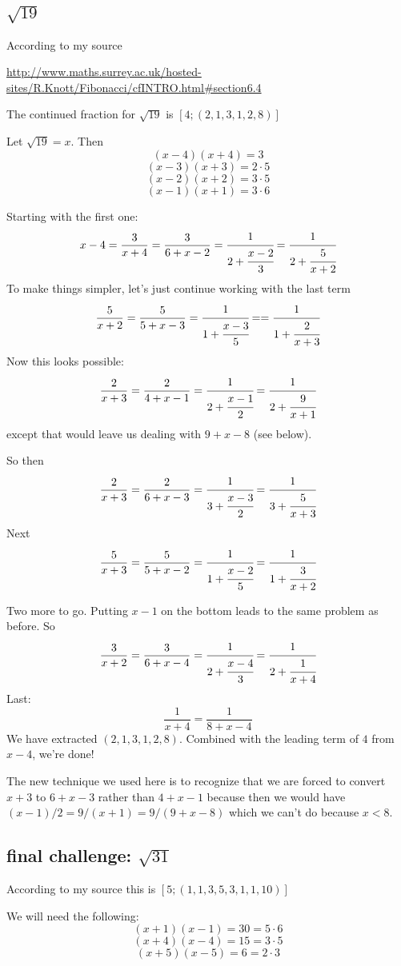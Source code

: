 \documentclass[11pt, oneside]{article}
\begin{document}
\subsection*{$\sqrt{19}$}
According to my source

\url{http://www.maths.surrey.ac.uk/hosted-sites/R.Knott/Fibonacci/cfINTRO.html#section6.4}

The continued fraction for $\sqrt{19}$ is $[4;(2,1,3,1,2,8)]$  

Let $\sqrt{19} = x$.  Then
\[ (x - 4)(x + 4) = 3 \]
\[ (x - 3)(x + 3) = 2 \cdot 5 \]
\[ (x - 2)(x + 2) = 3 \cdot 5 \]
\[ (x - 1)(x + 1) = 3 \cdot 6 \]

Starting with the first one:
\[ x - 4 = \frac{3}{x + 4} = \frac{3}{6 + x - 2} = \cfrac{1}{2 + \cfrac{x-2}{3}} = \cfrac{1}{2 + \cfrac{5}{x + 2}}  \]
To make things simpler, let's just continue working with the last term
\[ \frac{5}{x + 2} = \frac{5}{5 + x - 3} = \cfrac{1}{1 + \cfrac{x - 3}{5}} = = \cfrac{1}{1 + \cfrac{2}{x + 3}} \]
Now this looks possible:
\[ \frac{2}{x + 3} =  \frac{2}{4 + x - 1} =  \cfrac{1}{2 + \cfrac{x - 1}{2}} =  \cfrac{1}{2 + \cfrac{9}{x + 1}}  \]
except that would leave us dealing with $9 + x - 8$ (see below).

So then
\[ \frac{2}{x + 3} =  \frac{2}{6 + x - 3} =  \cfrac{1}{3 + \cfrac{x - 3}{2}} =  \cfrac{1}{3 + \cfrac{5}{x + 3}}  \]
Next
\[ \frac{5}{x + 3} = \frac{5}{5 + x - 2} =  \cfrac{1}{1 + \cfrac{x - 2}{5}} =  \cfrac{1}{1 + \cfrac{3}{x + 2}}  \]

Two more to go.  Putting $x - 1$ on the bottom leads to the same problem as before.  So
\[ \frac{3}{x + 2} = \frac{3}{6 + x - 4} =  \cfrac{1}{2 + \cfrac{x - 4}{3}} =  \cfrac{1}{2 + \cfrac{1}{x + 4}} \]
Last:
\[ \frac{1}{x + 4} = \frac{1}{8 + x - 4} \]
We have extracted $(2,1,3,1,2,8)$.  Combined with the leading term of $4$ from $x - 4$, we're done!

The new technique we used here is to recognize that we are forced to convert $x + 3$ to $6 + x - 3$ rather than $4 + x - 1$ because then we would have $(x - 1)/2 = 9/(x + 1) = 9/(9 + x - 8)$ which we can't do because $x < 8$.

\subsection*{final challenge:  $\sqrt{31}$}

According to my source this is $[5;(1,1,3,5,3,1,1,10)]$

We will need the following:
\[ (x + 1)(x - 1) = 30 = 5 \cdot 6 \]
\[ (x + 4)(x - 4) = 15 = 3 \cdot 5 \]
\[ (x + 5)(x - 5) = 6 = 2 \cdot 3 \]
\end{document}
